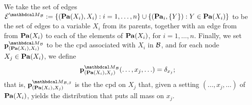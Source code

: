 \begin{defn}
%
We take the set of edges $\Ed^{\PDGof{{\mathcal B}}} := \{ (\Pa(X_i), X_i) : 
	 i = 1, \ldots, n \} \cup \{ (\Pa_i, \{Y\}) : Y \in
			\Pa(X_i)\}$ to be the set of edges to a variable $X_i$
	  from its parents, together with an edge from
	  from $\mathbf{Pa}(X_i)$ to each of the elements of $\mathbf{Pa}(X_i)$, for
	  $i = 1, \ldots, n$.  
	Finally, we set $\mat p^{\PDGof{{\mathcal
				B}}}_{(\Pa(X_i), X_i)}$ to be the cpd associated
			with $X_i$ in $\cal B$, and for each node $X_j \in \mathbf{Pa}(X_i)$,
			we define
	\[ \mat p^{\PDGof{\mathcal B}}_{(\Pa(X_i),
			  X_j)}(\ldots, x_j, \ldots) = \delta_{x_j};\]
that is,
$\mat p_{(\Pa(X_i), X_j)}^{\PDGof{\mathcal B, \beta}}$ is the the cpd 
on $X_j$ that, given a setting $(\ldots, x_j, \ldots)$ of $\mathbf{Pa}(X_i)$, yields the distribution that puts all mass on $x_j$. 
\end{defn}

